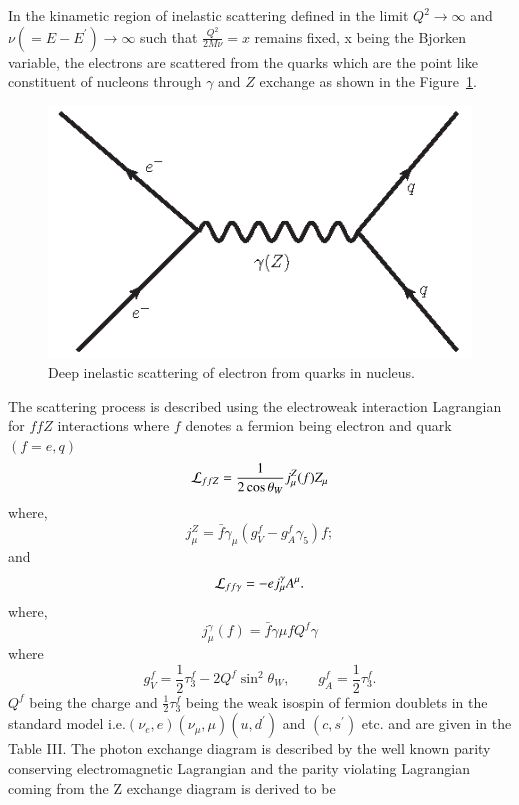 In the kinametic region of inelastic scattering defined in the limit $Q^2\rightarrow \infty$ and $\nu(=E-E^\prime)\rightarrow \infty$  such that $\frac{Q^2}{2M\nu}=x$ remains fixed, x being the Bjorken  variable,  the  electrons are scattered from the quarks which are the point like  constituent of nucleons  through $\gamma$ and $Z$ exchange as shown in the Figure~\ref{chap9-fig4}. 
\medskip

\begin{figure}[H]
\centering
\includegraphics[scale=0.35]{src/images/chap9/fig3.jpg}
\caption{Deep inelastic scattering of electron from quarks in nucleus.}\label{chap9-fig4}
\end{figure}

The scattering process is described using the electroweak interaction Lagrangian for $ffZ$ interactions where $f$ denotes a fermion being electron  and quark $(f=e,q)$
\begin{equation}
{\cal L}_{ffZ}= \frac{1}{2\cos\theta_W} j^Z_\mu(f) Z_\mu \label{chap9-eq28}
\end{equation}
where,
\begin{equation}
j_\mu^Z = \bar{f}\gamma_\mu(g_V^f-g_A^f\gamma_5)f; \label{chap9-eq29}
\end{equation}
and
\begin{equation}
{\cal L}_{ff\gamma}=-ej^\gamma_\mu A^\mu. \label{chap9-eq30}
\end{equation}
where, 
\begin{equation}
j_\mu^\gamma (f)= \bar{f}\gamma\mu f Q^f \gamma \label{chap9-eq31}
\end{equation}
where
\begin{equation}
g_V^f=\frac{1}{2}\tau_3^f-2Q^f \sin^2\theta_W,~~~~~~~~~
g_A^f=\frac{1}{2}\tau^f_3. \label{chap9-eq32}
\end{equation}
$Q^f$ being the charge and $\frac{1}{2}\tau^f_3$ being the weak isospin of fermion doublets in the standard model  i.e.$(\nu_e, e)(\nu_\mu,\mu)(u, d^\prime)$ and $(c,s^\prime)$ etc. and are given in the Table III. The photon exchange diagram is described by the well known parity conserving electromagnetic Lagrangian and the parity violating Lagrangian coming from the Z exchange diagram is  derived to be 
\bigskip

